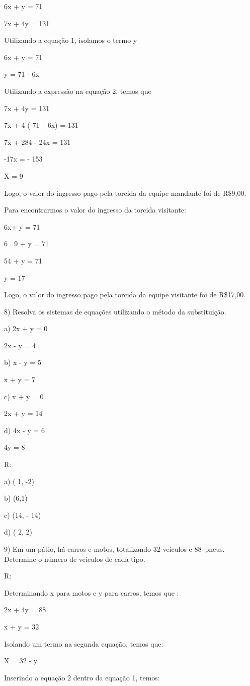 6x + y = 71

7x + 4y = 131

Utilizando a equação 1, isolamos o termo y

6x + y = 71

y = 71 - 6x

Utilizando a expressão na equação 2, temos que

7x + 4y = 131

7x + 4 ( 71 -- 6x) = 131

7x + 284 - 24x = 131

-17x = - 153

X = 9

Logo, o valor do ingresso pago pela torcida da equipe mandante foi de
R\$9,00.

Para encontrarmos o valor do ingresso da torcida visitante:

6x+ y = 71

6 . 9 + y = 71

54 + y = 71

y = 17

Logo, o valor do ingresso pago pela torcida da equipe visitante foi de
R\$17,00.

8) Resolva os sistemas de equações utilizando o método da substituição.

a) 2x + y = 0

2x - y = 4

b) x - y = 5

x + y = 7

c) x + y = 0

2x + y = 14

d) 4x - y = 6

4y = 8

R:

a) ( 1, -2)

b) (6,1)

c) (14, - 14)

d) ( 2, 2)

9) Em um pátio, há carros e motos, totalizando 32 veículos e 88~pneus.
Determine o número de veículos de cada tipo.

R:

Determinando x para motos e y para carros, temos que :

2x + 4y = 88

x + y = 32

Isolando um termo na segunda equação, temos que:

X = 32 - y

Inserindo a equação 2 dentro da equação 1, temos:

